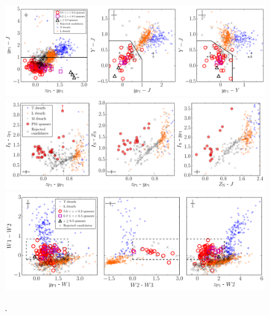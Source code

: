 \documentclass[11pt,a4paper]{article}
\begin{document}
\newpage
    \begin{figure}
      \centering
      \includegraphics[width=16.0cm,  trim={0.0cm 0 0 0},clip, angle=0]{f4_yj_selection.pdf}
      \includegraphics[width=16.0cm,  trim={0.0cm 0 0 0},clip, angle=0]{f6_ntt_colors.pdf}
      \includegraphics[width=16.0cm,  trim={0.0cm 0 0 0},clip, angle=0]{f5_wise_prioritization.pdf}
      \caption[]{\citet{Banados2016}.} 
      \label{fig:Banados2016_3panels}
    \end{figure}







\end{document}
